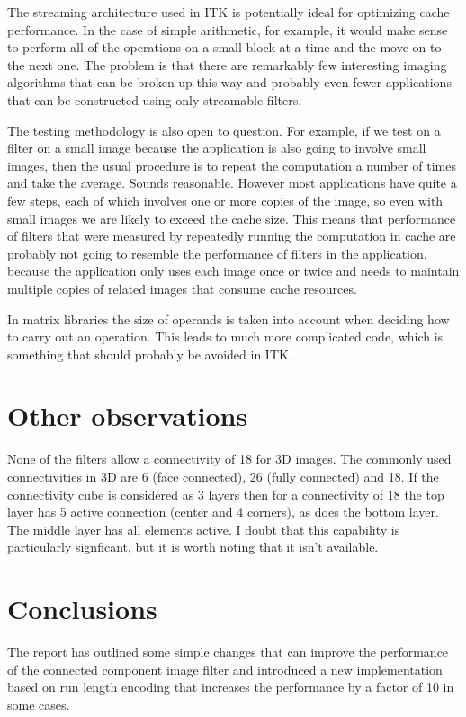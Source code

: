 \documentclass{InsightArticle}
\begin{document}
The streaming architecture used in ITK is potentially ideal for
optimizing cache performance. In the case of simple arithmetic, for
example, it would make sense to perform all of the operations on a
small block at a time and the move on to the next one. The problem is
that there are remarkably few interesting imaging algorithms that can
be broken up this way and probably even fewer applications that can be
constructed using only streamable filters.

The testing methodology is also open to question. For example, if we
test on a filter on a small image because the application is also
going to involve small images, then the usual procedure is to repeat
the computation a number of times and take the average. Sounds
reasonable. However most applications have quite a few steps, each of
which involves one or more copies of the image, so even with small
images we are likely to exceed the cache size. This means that
performance of filters that were measured by repeatedly running the
computation in cache are probably not going to resemble the
performance of filters in the application, because the application
only uses each image once or twice and needs to maintain multiple
copies of related images that consume cache resources.

In matrix libraries the size of operands is taken into account when
deciding how to carry out an operation. This leads to much more
complicated code, which is something that should probably be avoided
in ITK.

\section{Other observations}
None of the filters allow a connectivity of 18 for 3D images. The
commonly used connectivities in 3D are 6 (face connected), 26 (fully
connected) and 18. If the connectivity cube is considered as 3 layers
then for a connectivity of 18 the top layer has 5 active connection
(center and 4 corners), as does the bottom layer. The middle layer has
all elements active. I doubt that this capability is particularly
signficant, but it is worth noting that it isn't available.

\section{Conclusions}
The report has outlined some simple changes that can improve the
performance of the connected component image filter and introduced a
new implementation based on run length encoding that increases the
performance by a factor of 10 in some cases.



%
\nocite{ITKSoftwareGuide}
\end{document}
